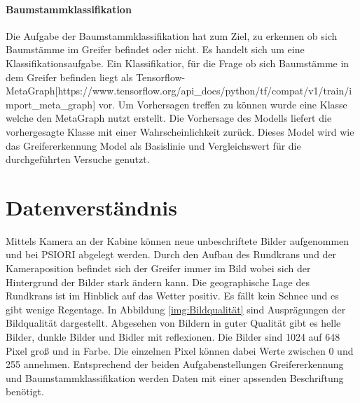 	\paragraph{Baumstammklassifikation} Die Aufgabe der Baumstammklassifikation hat zum Ziel, zu erkennen ob sich Baumstämme im Greifer befindet oder nicht. Es handelt sich um eine Klassifikationsaufgabe.
	Ein Klassifikatior, für die Frage ob sich Baumstämme in dem Greifer befinden liegt als Tensorflow-MetaGraph[https://www.tensorflow.org/api\_docs/python/tf/compat/v1/train/import\_meta\_graph] vor. Um Vorhersagen treffen zu können wurde eine Klasse welche den MetaGraph nutzt erstellt. Die Vorhersage des Modells liefert die vorhergesagte Klasse mit einer Wahrscheinlichkeit zurück. Dieses Model wird wie das Greifererkennung Model  als Basislinie und Vergleichswert für die durchgeführten Versuche genutzt.

	\section{Datenverständnis}
	\label{sec:DataUnderstanding}
	Mittels Kamera an der Kabine können neue unbeschriftete Bilder aufgenommen und bei PSIORI abgelegt werden. Durch den Aufbau des Rundkrans und der Kameraposition befindet sich der Greifer immer im Bild wobei sich der Hintergrund der Bilder stark ändern kann. Die geographische Lage des Rundkrans ist im Hinblick auf das Wetter positiv. Es fällt kein Schnee und es gibt wenige Regentage. In Abbildung  \ref{img:Bildqualität} sind Ausprägungen der  Bildqualität dargestellt. Abgesehen von Bildern in guter Qualität gibt es helle Bilder, dunkle Bilder und Bidler mit reflexionen. Die Bilder sind 1024 auf 648 Pixel groß und in Farbe. Die einzelnen Pixel können dabei Werte zwischen 0 und 255 annehmen. 
	Entsprechend der beiden Aufgabenstellungen Greifererkennung und Baumstammklassifikation werden Daten mit einer apssenden Beschriftung benötigt.
	
